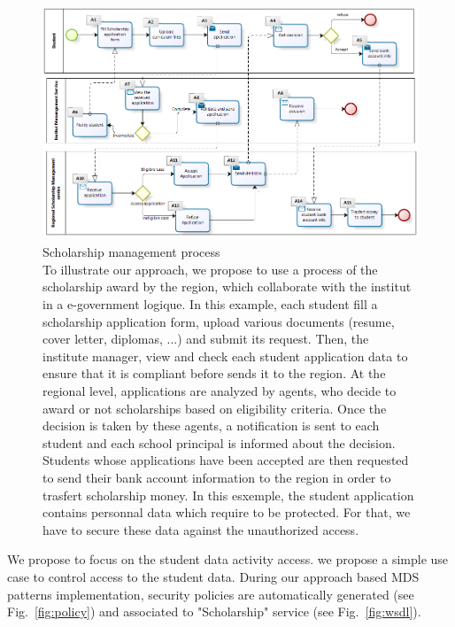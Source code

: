 \documentclass[runningheads,a4paper]{llncs}
\begin{document}
\begin{figure}  
\centering
\includegraphics[height=200pt, width=320pt]{BRPE_Eng.png}
\caption[Scholarship management process]{Scholarship management process\\ To illustrate our approach, we propose to use a process of the scholarship award by the region, which collaborate with the institut in a e-government logique. In this example, each student fill a scholarship application form, upload various documents (resume, cover letter, diplomas, ...) and submit its request. Then, the institute manager, view and check each student application data to ensure that it is compliant before sends it to the region. At the regional level, applications are analyzed by agents, who decide to award or not scholarships based on eligibility criteria. Once the decision is taken by these agents, a notification is sent to each student and each school principal is informed about the decision. Students whose applications have been accepted are then requested to send their bank account information to the region in order to trasfert scholarship money.
In this esxemple, the student application contains personnal data which require to be protected. For that, we have to secure these data against the unauthorized access.  }
\label{fig:bp}
\end{figure}


We propose to focus on the student data activity access. 
we propose a simple use case to control access to the student data. During our approach based MDS patterns implementation, security policies are automatically generated (see Fig.~\ref{fig:policy}) and associated to "Scholarship" service (see Fig.~\ref{fig:wsdl}).
\end{document}
